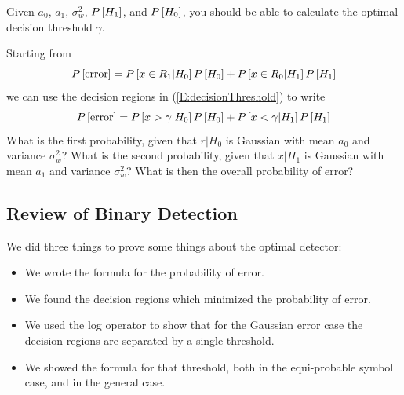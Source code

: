 


Given $a_0$, $a_1$, $\sigma_w^2$, $P\left[{H_1}\right]$, and $P\left[{H_0}\right]$, you
should be able to calculate the optimal decision threshold $\gamma$.

Starting from
\[
   P\left[{\mbox{error}}\right]  = P\left[{x \in R_1 | H_0}\right]P\left[{H_0}\right] +  P\left[{x \in R_0 | H_1 }\right]P\left[{H_1}\right]
\]
we can use the decision regions in (\ref{E:decisionThreshold}) to
write
\[
   P\left[{\mbox{error}}\right]  = P\left[{x > \gamma | H_0}\right]P\left[{H_0}\right] +  P\left[{x < \gamma | H_1 }\right]P\left[{H_1}\right]
\]
What is the first probability, given that $r|H_0$ is Gaussian with
mean $a_0$ and variance $\sigma_w^2$?  What is the second
probability, given that $x|H_1$ is Gaussian with mean $a_1$ and
variance $\sigma_w^2$?  What is then the overall probability of
error?



\subsection{Review of Binary Detection}
We did three things to prove some things about the optimal detector:
\begin{itemize}
  \item We wrote the formula for the probability of error.
  \item We found the decision regions which minimized the probability of error.
  \item We used the log operator to show that for the Gaussian error case the decision regions are separated by a single threshold.
  \item We showed the formula for that threshold, both in the equi-probable symbol case, and in the general case.
\end{itemize}
